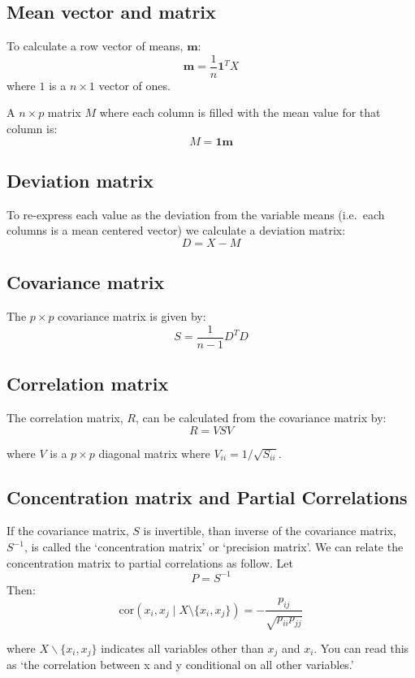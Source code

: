 \subsection{Mean vector and matrix}

To calculate a row vector of means, $\mathbf{m}$: \[
\mathbf{m} = \frac{1}{n} \mathbf{1}^T  X
\] where $1$ is a $n \times 1$ vector of ones.

A $n \times p$ matrix $M$ where each column is filled with the mean
value for that column is: 
\[
M = \mathbf{1}\mathbf{m}
\]

\subsection{Deviation matrix}

To re-express each value as the deviation from the variable means
(i.e.~each columns is a mean centered vector) we calculate a deviation
matrix: 
\[
D = X - M
\]

\subsection{Covariance matrix}

The $p \times p$ covariance matrix is given by: 
\[
S = \frac{1}{n-1} D^T D
\]

\subsection{Correlation matrix}

The correlation matrix, $R$, can be calculated from the covariance
matrix by: 
\[
R = V S V
\]

where $V$ is a $p \times p$ diagonal matrix where
$V_{ii} = 1/\sqrt{S_{ii}}$.

\subsection{Concentration matrix and Partial Correlations}

If the covariance matrix, $S$ is invertible, than inverse of the
covariance matrix, $S^{-1}$, is called the `concentration matrix' or
`precision matrix'. We can relate the concentration matrix to partial
correlations as follow. Let 
\[
P = S^{-1}
\]
Then:
\[
\mbox{cor}(x_i,x_j \mid X \setminus \{x_i,x_j\}) = -\frac{p_{ij}}{\sqrt{p_{ii} p_{jj}}}
\]

where $X \backslash \{x_i,x_j\}$ indicates all variables other than
$x_j$ and $x_i$. You can read this as `the correlation between x and y
conditional on all other variables.'

